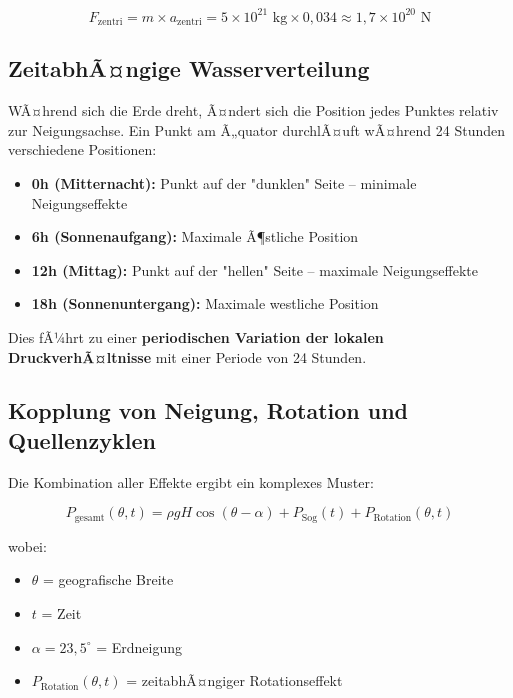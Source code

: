 ﻿\documentclass[12pt,a4paper]{report}
\begin{document}
\begin{equation}
	F_{\text{zentri}} = m \times a_{\text{zentri}} = 5 \times 10^{21} \text{ kg} \times 0{,}034 \approx 1{,}7 \times 10^{20} \text{ N}
\end{equation}

\subsection{ZeitabhÃ¤ngige Wasserverteilung}

WÃ¤hrend sich die Erde dreht, Ã¤ndert sich die Position jedes Punktes relativ zur Neigungsachse. Ein Punkt am Ã„quator durchlÃ¤uft wÃ¤hrend 24 Stunden verschiedene Positionen:

\begin{itemize}
	\item \textbf{0h (Mitternacht):} Punkt auf der "dunklen" Seite -- minimale Neigungseffekte
	\item \textbf{6h (Sonnenaufgang):} Maximale Ã¶stliche Position
	\item \textbf{12h (Mittag):} Punkt auf der "hellen" Seite -- maximale Neigungseffekte  
	\item \textbf{18h (Sonnenuntergang):} Maximale westliche Position
\end{itemize}

Dies fÃ¼hrt zu einer \textbf{periodischen Variation der lokalen DruckverhÃ¤ltnisse} mit einer Periode von 24 Stunden.

\subsection{Kopplung von Neigung, Rotation und Quellenzyklen}

Die Kombination aller Effekte ergibt ein komplexes Muster:

\begin{equation}
	P_{\text{gesamt}}(\theta, t) = \rho g H \cos(\theta - \alpha) + P_{\text{Sog}}(t) + P_{\text{Rotation}}(\theta, t)
\end{equation}

wobei:
\begin{itemize}
	\item $\theta$ = geografische Breite
	\item $t$ = Zeit
	\item $\alpha = 23{,}5^\circ$ = Erdneigung
	\item $P_{\text{Rotation}}(\theta, t)$ = zeitabhÃ¤ngiger Rotationseffekt
\end{itemize}
\end{document}
